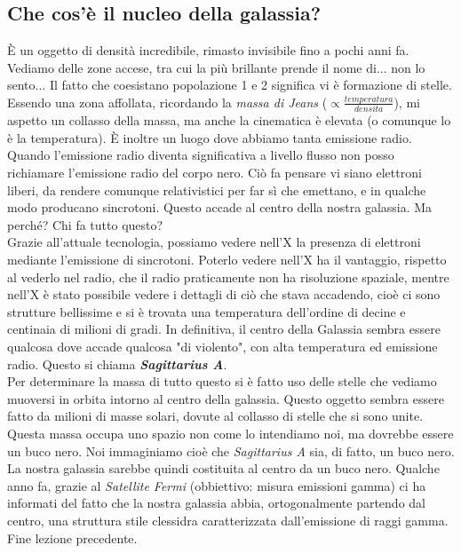 \documentclass[a4paper,11pt]{article}
\begin{document}
\subsection{Che cos'è il nucleo della galassia?}
È un oggetto di densità incredibile, rimasto invisibile fino a pochi anni fa. 
Vediamo delle zone accese, tra cui la più brillante prende il nome di... non lo sento... 
Il fatto che coesistano popolazione 1 e 2 significa vi è formazione di stelle. Essendo una zona affollata, ricordando la \textit{massa di Jeans} ($\propto\frac{temperatura}{densita}$), mi aspetto un collasso della massa, ma anche la cinematica è elevata (o comunque lo è la temperatura). È inoltre un luogo dove abbiamo tanta emissione radio. Quando l'emissione radio diventa significativa a livello flusso non posso richiamare l'emissione radio del corpo nero. Ciò fa pensare vi siano elettroni liberi, da rendere comunque relativistici per far sì che emettano, e in qualche modo producano sincrotoni. Questo accade al centro della nostra galassia. Ma perché? Chi fa tutto questo?\\
Grazie all'attuale tecnologia, possiamo vedere nell'X la presenza di elettroni mediante l'emissione di sincrotoni. Poterlo vedere nell'X ha il vantaggio,  rispetto al vederlo nel radio, che il radio praticamente non ha risoluzione spaziale, mentre nell'X è stato possibile vedere i dettagli di ciò che stava accadendo, cioè ci sono strutture bellissime e si è trovata una temperatura dell'ordine di decine e centinaia di milioni di gradi. In definitiva, il centro della Galassia sembra essere qualcosa dove accade qualcosa "di violento", con alta temperatura ed emissione radio. Questo si chiama \textbf{\textit{Sagittarius A}}.\\
Per determinare la massa di tutto questo si è fatto uso delle stelle che vediamo muoversi in orbita intorno al centro della galassia. Questo oggetto sembra essere fatto da milioni di masse solari, dovute al collasso di stelle che si sono unite. Questa massa occupa uno spazio non come lo intendiamo noi, ma dovrebbe essere un buco nero. Noi immaginiamo cioè che \textit{Sagittarius A} sia, di fatto, un buco nero. 
La nostra galassia sarebbe quindi costituita al centro da un buco nero. Qualche anno fa, grazie al \textit{Satellite Fermi} (obbiettivo: misura emissioni gamma) ci ha informati del fatto che la nostra galassia abbia, ortogonalmente partendo dal centro, una struttura stile clessidra caratterizzata dall'emissione di raggi gamma. \\
Fine lezione precedente.
\end{document}
